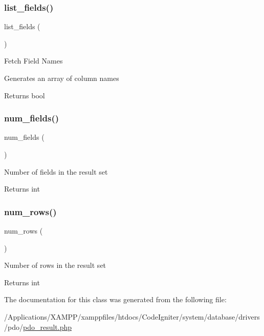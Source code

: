 \subsubsection{\texorpdfstring{list\+\_\+fields()}{list\_fields()}}
{\footnotesize\ttfamily list\+\_\+fields (\begin{DoxyParamCaption}{ }\end{DoxyParamCaption})}

Fetch Field Names

Generates an array of column names

\begin{DoxyReturn}{Returns}
bool 
\end{DoxyReturn}
\mbox{\label{class_c_i___d_b__pdo__result_af831bf363e4d7d661a717a4932af449d}} 
\subsubsection{\texorpdfstring{num\+\_\+fields()}{num\_fields()}}
{\footnotesize\ttfamily num\+\_\+fields (\begin{DoxyParamCaption}{ }\end{DoxyParamCaption})}

Number of fields in the result set

\begin{DoxyReturn}{Returns}
int 
\end{DoxyReturn}
\mbox{\label{class_c_i___d_b__pdo__result_a218657c303ee499b97710ab0cd2f5d6e}} 
\subsubsection{\texorpdfstring{num\+\_\+rows()}{num\_rows()}}
{\footnotesize\ttfamily num\+\_\+rows (\begin{DoxyParamCaption}{ }\end{DoxyParamCaption})}

Number of rows in the result set

\begin{DoxyReturn}{Returns}
int 
\end{DoxyReturn}


The documentation for this class was generated from the following file\+:\begin{DoxyCompactItemize}
\item 
/\+Applications/\+X\+A\+M\+P\+P/xamppfiles/htdocs/\+Code\+Igniter/system/database/drivers/pdo/\mbox{\hyperlink{pdo__result_8php}{pdo\+\_\+result.\+php}}\end{DoxyCompactItemize}
